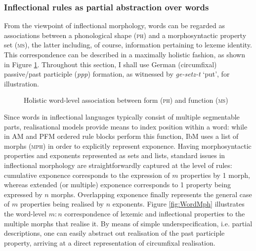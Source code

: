 \documentclass[output=paper]{langsci/langscibook}
\begin{document}
\subsubsection{Inflectional rules as partial abstraction over words}
From the viewpoint of inflectional morphology, words can be regarded
as associations between a phonological shape (\textsc{ph}) and a
morphosyntactic property set (\textsc{ms}), the latter including, of
course, information pertaining to lexeme identity. This correspondence
can be described in a maximally holistic fashion, as shown in Figure
\ref{fig:Word}. Throughout this section, I shall use German
(circumfixal) passive/past participle (\emph{ppp}) formation, as
witnessed by \textit{ge-setz-t} `put', for illustration.

\begin{figure}
  \caption{Holistic word-level association between form (\textsc{ph}) and
    function (\textsc{ms})}
  \label{fig:Word}
\end{figure}

Since words in inflectional languages typically consist of multiple
segment\-able parts, realisational models provide means to index
position within a word: while in AM and PFM ordered rule blocks
perform this function, IbM uses a list of morphs (\textsc{mph}) in order
to explicitly represent exponence. Having morphosyntactic
properties and exponents represented as sets and lists, standard issues in
inflectional morphology are straightforwardly captured at the level of rules: cumulative
exponence corresponds to the expression of $m$ properties by 1 morph,
whereas extended (or multiple) exponence corresponds to 1 property
being expressed by $n$ morphs. Overlapping exponence finally
represents the general case of $m$ properties being realised by $n$
exponents. Figure \ref{fig:WordMph} illustrates the word-level $m:n$
correspondence of lexemic and inflectional properties to the multiple
morphs that realise it. By means of simple underspecification,
i.e. partial descriptions, one can easily abstract out realisation of
the past participle property, arriving at a direct representation of circumfixal
realisation.
\end{document}
